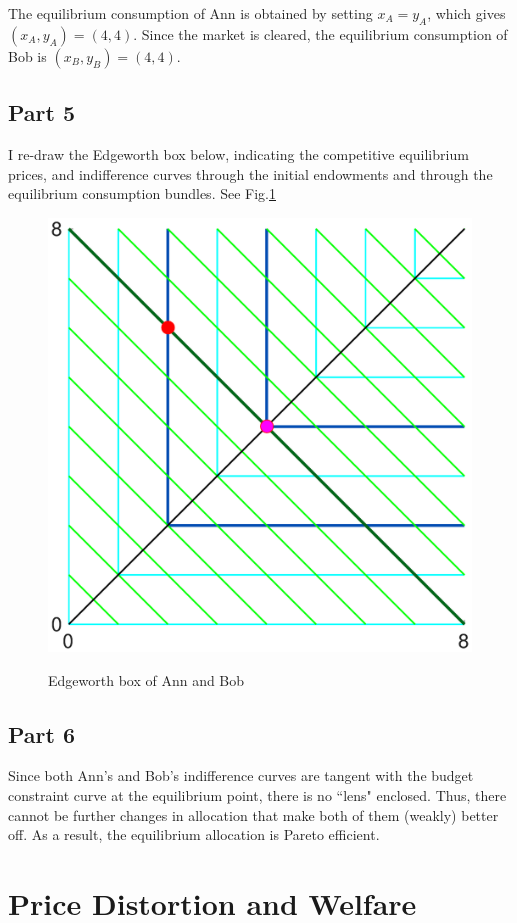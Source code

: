 \documentclass{article}
\begin{document}
The equilibrium consumption of Ann is obtained by setting $x_A=y_A$, which gives $(x_A,y_A)=(4,4)$. Since the market is cleared, the equilibrium consumption of Bob is $(x_B,y_B)=(4,4)$.

\subsection{Part 5}
I re-draw the Edgeworth box below, indicating the competitive equilibrium prices, and indifference curves through the initial endowments and through the equilibrium consumption bundles. See Fig.\ref{EdgeworthNew}
\begin{figure}[!htbp]
	\centering
	\includegraphics[width=12cm]{figure4.eps}\\
	\caption{Edgeworth box of Ann and Bob}
	\label{EdgeworthNew}
\end{figure}

\subsection{Part 6}
Since both Ann's and Bob's indifference curves are tangent with the budget constraint curve at the equilibrium point, there is no ``lens" enclosed. Thus, there cannot be further changes in allocation that make both of them (weakly) better off. As a result, the equilibrium allocation is Pareto efficient.

\section{Price Distortion and Welfare}
\end{document}
